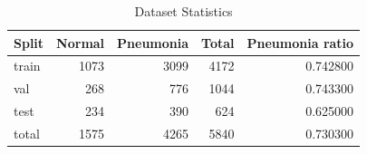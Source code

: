 \begin{table}
\caption{Dataset Statistics}
\label{tab:dataset}
\begin{tabular}{lrrrr}
\toprule
Split & Normal & Pneumonia & Total & Pneumonia ratio \\
\midrule
train & 1073 & 3099 & 4172 & 0.742800 \\
val & 268 & 776 & 1044 & 0.743300 \\
test & 234 & 390 & 624 & 0.625000 \\
total & 1575 & 4265 & 5840 & 0.730300 \\
\bottomrule
\end{tabular}
\end{table}
